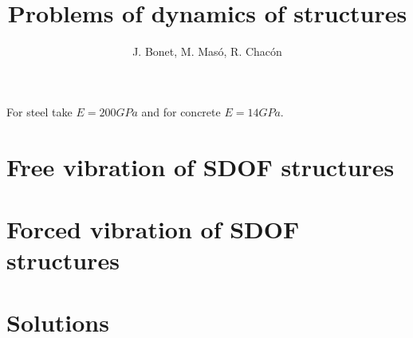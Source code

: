 \documentclass{problems}
\title{Problems of dynamics of structures}
\author{J. Bonet, M. Masó, R. Chacón}
\begin{document}
\maketitle

For steel take $E=200GPa$ and for concrete $E=14GPa$.

\section{Free vibration of SDOF structures}





\section{Forced vibration of SDOF structures}









\newpage
\section{Solutions}

\shipoutAnswer



\printbibliography
\end{document}
